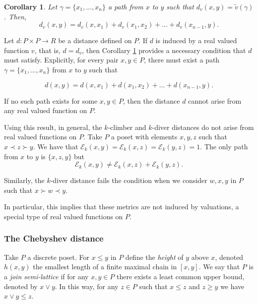 \documentclass{article}[12pt]
\theoremstyle{exampstyle}
\newtheorem{corollary}[theorem]{Corollary}
\theoremstyle{remark}
\newcommand{\E}{\mathcal{E}}
\newcommand{\tuple}[3][1]{#2_{#1}, \dots , #2_{#3}}
\begin{document}
\begin{corollary}
    Let $\gamma = \{ \tuple{x}{n}\}$ a path from $x$ to $y$ such that $d_v(x,y) = \tilde{v}(\gamma)$. Then, 
    \begin{equation*}
        d_v(x,y) =  d_v(x,x_1) + d_v(x_1,x_2)+ \ldots + d_v(x_{n-1},y).
    \end{equation*}
    \label{coro:dv_splits}
\end{corollary}

Let $d: P \times P \to R$ be a distance defined on $P$. If $d$ is induced by a real valued function $v$, that is, $d = d_v$, then Corollary \ref{coro:dv_splits} provides a necessary condition that $d$ must satisfy. Explicitly, for every pair $x,y \in P$, there must exist a path $\gamma = \{ \tuple{x}{n}\} $ from $x$ to $y$ such that 

\begin{equation*}
    d(x,y) =  d(x,x_1) + d(x_1,x_2)+ \ldots + d(x_{n-1},y).
\end{equation*}

If no such path exists for some $x,y \in P$, then the distance $d$ cannot arise from any real valued function on $P$.

Using this result, in general, the $k$-climber and $k$-diver distances do not arise from real valued functions on $P$. Take $P$ a poset with elements $x,y,z$  such that $x \prec z \succ y$. We have that $\E_k(x,y) = \E_k(x,z) = \E_k(y,z) = 1$. The only path from $x$ to $y$ is $\{x,z,y\}$ but
\[ \E_k(x,y)  \neq  \E_k(x,z) + \E_k(y,z).\]

Similarly, the $k$-diver distance fails the condition when we consider  $w,x,y$ in $P$ such that $x \succ w \prec y$.

In particular, this implies that these metrics are not induced by valuations, a special type of real valued functions on $P$.



\subsubsection*{The Chebyshev distance}

Take $P$ a discrete poset. For $x \leq y$ in $P$ define the \textit{height} of $y$ above $x$, denoted $h(x,y)$ the smallest length of a finite maximal chain in $[x,y]$. We say that $P$ is a \textit{join semi-lattice} if for any $x,y \in P$ there exists a least common upper bound, denoted by $x \vee y$. In this way, for any $z \in P$ such that $x \leq z$ and $z \geq y$ we have $x \vee y \leq z$. 
\end{document}
